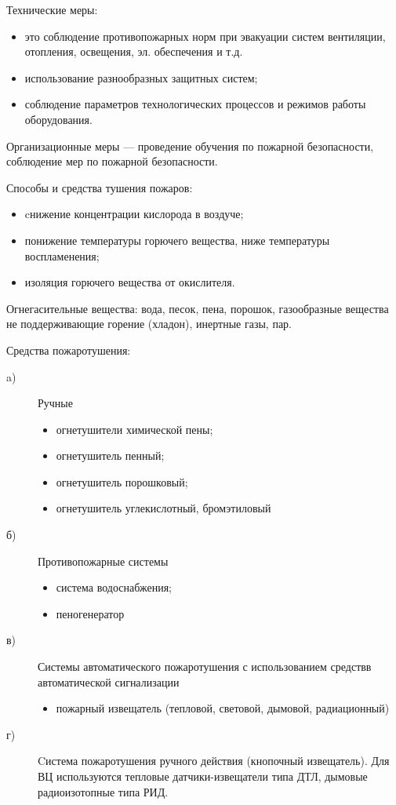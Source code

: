 Технические меры:
\begin{itemize}
\item это соблюдение противопожарных норм при эвакуации систем вентиляции, отопления, освещения, эл. обеспечения и т.д.
\item использование разнообразных защитных систем;
\item соблюдение параметров технологических процессов и режимов работы оборудования.
\end{itemize}

Организационные меры — проведение обучения по пожарной безопасности, соблюдение мер по пожарной безопасности.

Способы и средства тушения пожаров:
\begin{itemize}
\item cнижение концентрации кислорода в воздуче;
\item понижение температуры горючего вещества, ниже температуры воспламенения;
\item изоляция горючего вещества от окислителя.
\end{itemize}

Огнегасительные вещества: вода, песок, пена, порошок, газообразные вещества не поддерживающие горение (хладон), инертные газы, пар.

Средства пожаротушения:
\begin{description}
\item[a)]Ручные
	\begin{itemize}
	\item огнетушители химической пены;
	\item огнетушитель пенный;
	\item огнетушитель порошковый;
	\item огнетушитель углекислотный, бромэтиловый
	\end{itemize}

\item[б)] Противопожарные системы
	\begin{itemize}
	\item система водоснабжения;
	\item пеногенератор
	\end{itemize}

\item[в)] Системы автоматического пожаротушения с использованием средствв автоматической сигнализации
	\begin{itemize}
	\item пожарный извещатель (тепловой, световой, дымовой, радиационный)
	\end{itemize}

\item[г)] Cистема пожаротушения ручного действия (кнопочный извещатель).
Для ВЦ используются тепловые датчики-извещатели типа ДТЛ, дымовые радиоизотопные типа РИД.
\end{description}

